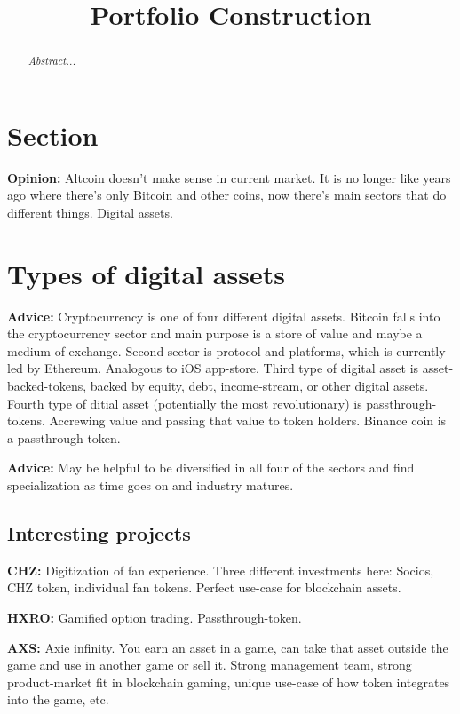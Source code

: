 \documentclass[10pt,twocolumn]{article}
\title{\textbf{Portfolio Construction\vspace{-2em}}}
\date{}
\begin{document}
\setlength{\parskip}{10px}%
\setlength{\parindent}{0pt}
\setlength{\footskip}{1.5em}
\maketitle
\begin{abstract}
{\em Abstract...}
\end{abstract}

\section{Section} %

\textbf{Opinion:} Altcoin doesn't make sense in current market. It is no longer
like years ago where there's only Bitcoin and other coins, now there's main
sectors that do different things. Digital assets. 

\section{Types of digital assets}

\textbf{Advice:} Cryptocurrency is one of four different digital assets. Bitcoin
falls into the cryptocurrency sector and main purpose is a store of value and
maybe a medium of exchange. Second sector is protocol and platforms, which is
currently led by Ethereum. Analogous to iOS app-store. Third type of digital
asset is asset-backed-tokens, backed by equity, debt, income-stream, or other digital
assets. Fourth type of ditial asset (potentially the most revolutionary) is
passthrough-tokens. Accrewing value and passing that value to token holders.
Binance coin is a passthrough-token.  

\textbf{Advice:} May be helpful to be diversified in all four of the sectors and
find specialization as time goes on and industry matures. 

\subsection{Interesting projects}
\textbf{CHZ:} Digitization of fan experience. Three different investments here:
Socios, CHZ token, individual fan tokens. Perfect use-case for blockchain
assets. 

\textbf{HXRO:} Gamified option trading. Passthrough-token. 

\textbf{AXS:} Axie infinity. You earn an asset in a game, can take that asset
outside the game and use in another game or sell it. Strong management team,
strong product-market fit in blockchain gaming, unique use-case of how token
integrates into the game, etc. 
\end{document}
